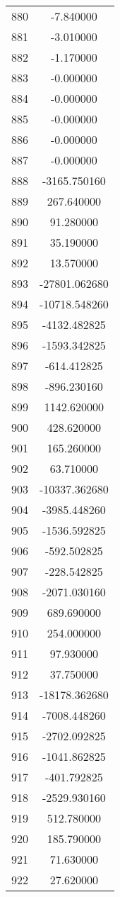 \documentclass[12pt]{article}
\begin{document}
\begin{longtable}{@{}cc@{}}
880 & -7.840000 \\
881 & -3.010000 \\
882 & -1.170000 \\
883 & -0.000000 \\
884 & -0.000000 \\
885 & -0.000000 \\
886 & -0.000000 \\
887 & -0.000000 \\
888 & -3165.750160 \\
889 & 267.640000 \\
890 & 91.280000 \\
891 & 35.190000 \\
892 & 13.570000 \\
893 & -27801.062680 \\
894 & -10718.548260 \\
895 & -4132.482825 \\
896 & -1593.342825 \\
897 & -614.412825 \\
898 & -896.230160 \\
899 & 1142.620000 \\
900 & 428.620000 \\
901 & 165.260000 \\
902 & 63.710000 \\
903 & -10337.362680 \\
904 & -3985.448260 \\
905 & -1536.592825 \\
906 & -592.502825 \\
907 & -228.542825 \\
908 & -2071.030160 \\
909 & 689.690000 \\
910 & 254.000000 \\
911 & 97.930000 \\
912 & 37.750000 \\
913 & -18178.362680 \\
914 & -7008.448260 \\
915 & -2702.092825 \\
916 & -1041.862825 \\
917 & -401.792825 \\
918 & -2529.930160 \\
919 & 512.780000 \\
920 & 185.790000 \\
921 & 71.630000 \\
922 & 27.620000 \\

\end{longtable}
\end{document}
